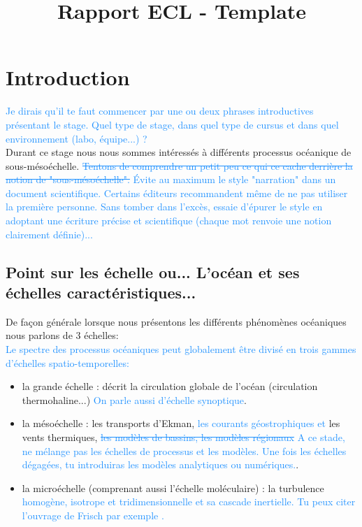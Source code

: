 \documentclass{rapportECC}
\title{Rapport ECL - Template} %
\newcommand{\FAadd}[1]{\textcolor{DodgerBlue}{{#1}}}                     %
\newcommand{\FAdel}[1]{\textcolor{DodgerBlue}{\sout{#1}}}                %
\begin{document}





        
\fairemarges %
\fairepagedegarde %
\tabledematieres %

\section{Introduction} 


\FAadd{Je dirais qu'il te faut commencer par une ou deux phrases introductives présentant le stage. Quel type de stage, dans quel type de cursus et dans quel environnement (labo, équipe...) ?}\\
Durant ce stage nous nous sommes intéressés à différents processus océanique de sous-mésoéchelle. \FAdel{Tentons de comprendre un petit peu ce qui ce cache derrière la notion de "sous-mésoéchelle".}
\FAadd{Évite au maximum le style "narration" dans un document scientifique. Certains éditeurs recommandent même de ne pas utiliser la première personne. Sans tomber dans l'excès, essaie d'épurer le style en adoptant une écriture précise et scientifique (chaque mot renvoie une notion clairement définie)...}

\subsection{Point sur les échelle  ou... L'océan et ses échelles caractéristiques...}
De façon générale lorsque nous présentons les différents phénomènes océaniques nous parlons de 3 échelles:\\
\FAadd{Le spectre des processus océaniques peut globalement être divisé en trois gammes d'échelles spatio-temporelles:}
\begin{itemize}
    \item la grande échelle : décrit la circulation globale de l'océan (circulation thermohaline...) \FAadd{ On parle aussi d'échelle synoptique}.
    \item la mésoéchelle : les transports d'Ekman, \FAadd{les courants géostrophiques et} les vents thermiques, \FAdel{les modèles de bassins, les modèles régionaux} \FAadd{A ce stade, ne mélange pas les échelles de processus et les modèles. Une fois les échelles dégagées, tu introduiras les modèles analytiques ou numériques.}.
    \item la microéchelle (comprenant aussi l'échelle moléculaire) : la turbulence \FAadd{homogène, isotrope et tridimensionnelle et sa cascade inertielle. Tu peux citer l'ouvrage de Frisch par exemple \cite{frisch_turbulence_1995}.}
\end{itemize}
\end{document}
